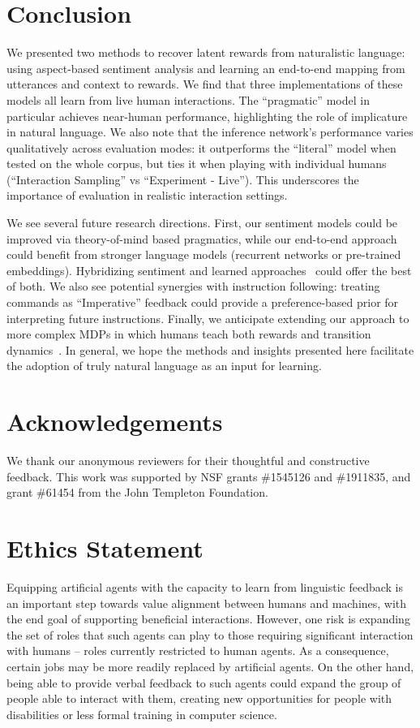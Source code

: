 \documentclass[letterpaper]{article} %
\begin{document}
\section{Conclusion}
\label{conclusion_section}
We presented two methods to recover latent rewards from naturalistic language: using aspect-based sentiment analysis and learning an end-to-end mapping from utterances and context to rewards. We find that three implementations of these models all learn from live human interactions. The ``pragmatic'' model in particular achieves near-human performance, highlighting the role of implicature in natural language. We also note that the inference network's performance varies qualitatively across evaluation modes: it outperforms the ``literal'' model when tested on the whole corpus, but ties it when playing with individual humans (``Interaction Sampling'' vs ``Experiment - Live''). This underscores the importance of evaluation in realistic interaction settings.

We see several future research directions. First, our sentiment models could be improved via theory-of-mind based pragmatics, while our end-to-end approach could benefit from stronger language models (recurrent networks or pre-trained embeddings). Hybridizing sentiment and learned approaches~\cite{jiang2011target, xu2019bertsentiment} could offer the best of both. We also see potential synergies with instruction following: treating commands as ``Imperative'' feedback could provide a preference-based prior for interpreting future instructions. Finally, we anticipate extending our approach to more complex MDPs in which humans teach both rewards and transition dynamics~\cite{narasimhan2018grounding}. In general, we hope the methods and insights presented here facilitate the adoption of truly natural language as an input for learning. 

\newpage

\section*{Acknowledgements}
We thank our anonymous reviewers for their thoughtful and constructive feedback. This work was supported by NSF grants \#1545126 and \#1911835, and grant \#61454 from the John Templeton Foundation. 

\section*{Ethics Statement}

Equipping artificial agents with the capacity to learn from linguistic feedback is an important step towards value alignment between humans and machines, with the end goal of supporting beneficial interactions. However, one risk is expanding the set of roles that such agents can play to those requiring significant interaction with humans --  roles currently restricted to human agents. As a consequence, certain jobs may be more readily replaced by artificial agents. On the other hand, being able to provide verbal feedback to such agents could expand the group of people able to interact with them, creating new opportunities for people with disabilities or less formal training in computer science.

\small 

\end{document}

